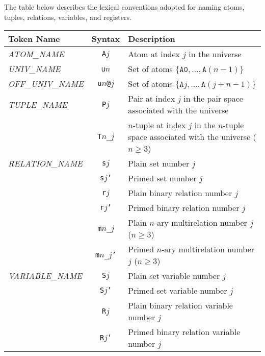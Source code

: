 \documentclass[a4paper,12pt]{article}
\begin{document}
    The table below describes the lexical conventions adopted for naming atoms,
    tuples, relations, variables, and registers.

    \begin{center}
        \small
        \begin{supertabular}{l|c|p{89mm}} %
            Token Name & Syntax & Description \\[.4ex]
            \hline
            \strut{}%
            \textit{ATOM\_NAME} & \texttt{A}$j$ & Atom at index $j$ in the universe\bigstrut \\
            \textit{UNIV\_NAME} & \texttt{u}$n$ & Set of atoms $\{\texttt{A0}, \ldots, \texttt{A}(n - 1)\}$\bigstrut \\
            \textit{OFF\_UNIV\_NAME} & \texttt{u}$n$\texttt{@}$j$ & Set of atoms $\{\texttt{A}j, \ldots, \texttt{A}(j + n - 1)\}$\bigstrut \\
            \bigstrut\textit{TUPLE\_NAME} & \texttt{P}$j$ & Pair at index $j$ in the pair space associated with the universe\bigstrut \\
            \bigstrut & \texttt{T}$n$\texttt{\_}$j$ & $n$-tuple at index $j$ in the $n$-tuple space
            associated with the universe ($n \ge 3$)\bigstrut \\
            \textit{RELATION\_NAME} & \texttt{s}$j$ & Plain set number $j$\bigstrut \\
            & \texttt{s}$j$\texttt{'} & Primed set number $j$\bigstrut \\
            & \texttt{r}$j$ & Plain binary relation number $j$\bigstrut \\
            & \texttt{r}$j$\texttt{'} & Primed binary relation number $j$\bigstrut \\
            & \texttt{m}$n$\texttt{\_}$j$ & Plain $n$-ary multirelation number $j$ ($n \ge 3$)\bigstrut \\
            & \texttt{m}$n$\texttt{\_}$j$\texttt{'} & Primed $n$-ary multirelation number $j$ ($n \ge 3$)\bigstrut \\
            \textit{VARIABLE\_NAME} & \texttt{S}$j$ & Plain set variable number $j$\bigstrut \\
            & \texttt{S}$j$\texttt{'} & Primed set variable number $j$\bigstrut \\
            & \texttt{R}$j$ & Plain binary relation variable number $j$\bigstrut \\
            & \texttt{R}$j$\texttt{'} & Primed binary relation variable number $j$\bigstrut \\

\end{supertabular}
\end{center}
\end{document}

